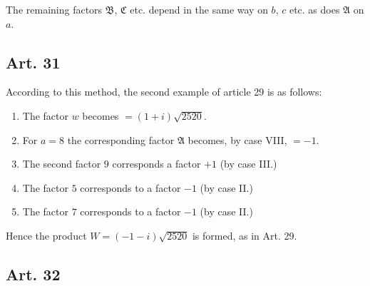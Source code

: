 \documentclass{book}
\theoremstyle{plain}
\theoremstyle{remark}
\begin{document}
The remaining factors $\mathfrak{B}$, $\mathfrak{C}$ etc. depend in the same way on $b$, $c$ etc. as does $\mathfrak{A}$ on $a$.

\subsection*{Art. 31}

According to this method, the second example of article 29 is as follows:

\begin{enumerate}
\item[ ] The factor $w$ becomes $=(1+i)\sqrt{2520}$.
\item[ ] For $a=8$ the corresponding factor $\mathfrak{A}$ becomes, by case VIII, $=-1$.
\item[ ] The second factor $9$ corresponds a factor $+1$ (by case III.)
\item[ ] The factor $5$ corresponds to a factor $-1$ (by case II.)
\item[ ] The factor $7$ corresponds to a factor $-1$ (by case II.) 
\end{enumerate}
Hence the product $W = (-1-i)\sqrt{2520}$ is formed, as in Art. 29.

\subsection*{Art. 32} 
\end{document}
